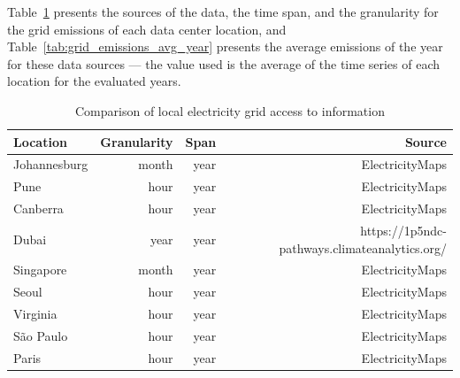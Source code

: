 Table~\ref{tab:grid_emissions_hist} presents the sources of the data, the time span, and the granularity for the grid emissions of each data center location, and Table~\ref{tab:grid_emissions_avg_year} presents the average  emissions of the year for these data sources --- the value used is the average of the time series of each location for the evaluated years.


\begin{table}[h]  
\caption{Comparison of local electricity grid access to information }\label{tab:grid_emissions_hist} \centering  
  \begin{tabular}{|l|r|r|r|}
    \hline
    
  \textbf{Location} &   \textbf{Granularity} & \textbf{Span} & \textbf{Source} \\
  \hline
  Johannesburg & month & year & ElectricityMaps  \\
  \hline
  Pune  & hour & year & ElectricityMaps  \\
  \hline
  Canberra  & hour &  year & ElectricityMaps \\
  \hline
  Dubai    & year & year & https://1p5ndc-pathways.climateanalytics.org/  \\
  \hline
  Singapore & month & year & ElectricityMaps \\
  \hline     
  Seoul     & hour & year & ElectricityMaps \\
  \hline
  Virginia  &  hour & year & ElectricityMaps \\
  \hline
  São Paulo & hour & year  & ElectricityMaps \\
  \hline 
  Paris     & hour & year  & ElectricityMaps  \\
  \hline
\end{tabular}  
\end{table}


